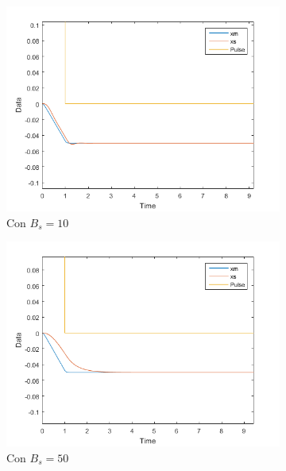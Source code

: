 \documentclass[a4paper, fontsize=11pt]{scrartcl} %
\numberwithin{equation}{section} %
\numberwithin{figure}{section} %
\numberwithin{table}{section} %
\begin{document}
	\begin{figure}[h!]
		\centering
		\begin{subfigure}[t]{.5\textwidth}
			\centering
			\includegraphics[width=1\linewidth]{images/Bs10-FP.PNG}
			\caption{Con $B_s = 10$}
			\label{Bs10-FP}
		\end{subfigure}%
		\begin{subfigure}[t]{.5\textwidth}
			\centering
			\includegraphics[width=1\linewidth]{images/Bs50-FP.PNG}
			\caption{Con $B_s = 50$}
			\label{Bs30-FP}
		\end{subfigure}
		\begin{subfigure}[t]{.5\textwidth}
			\centering

\end{subfigure}
\end{figure}
\end{document}
